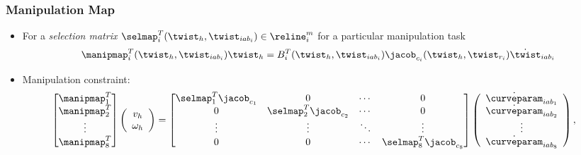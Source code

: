 \begin{frame}
	\frametitle{Manipulation Map}
	\begin{itemize}
		\item For a \textit{selection matrix} $\selmap_i^T(\twist_h, \twist_{{iab}_i}) \in \reline^m_i$ for a particular manipulation task
		\begin{align}
		\manipmap_i^T(\twist_h, \twist_{{iab}_i}) \twist_h = {B}_i^T(\twist_h, \twist_{{iab}_i}) \jacob_{c_i}(\twist_h, \twist_{r_i}) \dot{\twist}_{{iab}_i}
		\label{eq:head-vel-map}
		\end{align}
	\item Manipulation constraint:
	\begin{align}
	\begin{bmatrix}
	\manipmap_1^T \\ 	\manipmap_2^T \\ \vdots \\ 	\manipmap_8^T
	\end{bmatrix} 
	\left(\begin{array}{c}
	v_h \\ \omega_h
	\end{array}\right)
	&= \begin{bmatrix}
	\selmap_1^T \jacob_{c_1} & 0 & \cdots & 0 \\
	0 & \selmap_2^T \jacob_{c_2} & \cdots & 0 \\
	\vdots & \vdots & \ddots & \vdots \\
	0 & 0 & \cdots & \selmap_8^T \jacob_{c_8}
	\end{bmatrix} 	\left(\begin{array}{c}
	\dot{\curveparam}_{{iab}_1} \\ \dot{\curveparam}_{{iab}_2} \\ \vdots \\ \dot{\curveparam}_{{iab}_8}
	\end{array}\right) 
	\label{eq:manip_map},
	\end{align}
	\end{itemize}
\end{frame}

